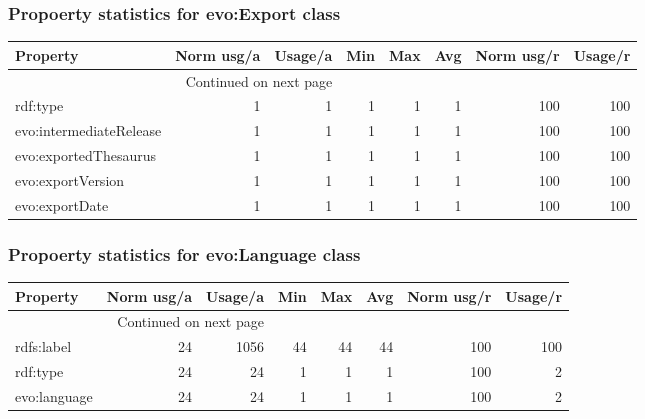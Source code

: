 \documentclass[10pt,a4paper,titlepage,final]{article}
\begin{document}
\subsubsection{Propoerty statistics for evo:Export class}
\begin{longtable}{lrrrrrrr}
\toprule
                Property &  Norm usg/a &  Usage/a &  Min &  Max &  Avg &  Norm usg/r &  Usage/r \\
\midrule
\endhead
\midrule
\multicolumn{3}{r}{{Continued on next page}} \\
\midrule
\endfoot

\bottomrule
\endlastfoot
                rdf:type &           1 &        1 &    1 &    1 &    1 &         100 &      100 \\
 evo:intermediateRelease &           1 &        1 &    1 &    1 &    1 &         100 &      100 \\
   evo:exportedThesaurus &           1 &        1 &    1 &    1 &    1 &         100 &      100 \\
       evo:exportVersion &           1 &        1 &    1 &    1 &    1 &         100 &      100 \\
          evo:exportDate &           1 &        1 &    1 &    1 &    1 &         100 &      100 \\
\end{longtable}


\subsubsection{Propoerty statistics for evo:Language class}
\begin{longtable}{lrrrrrrr}
\toprule
     Property &  Norm usg/a &  Usage/a &  Min &  Max &  Avg &  Norm usg/r &  Usage/r \\
\midrule
\endhead
\midrule
\multicolumn{3}{r}{{Continued on next page}} \\
\midrule
\endfoot

\bottomrule
\endlastfoot
   rdfs:label &          24 &     1056 &   44 &   44 &   44 &         100 &      100 \\
     rdf:type &          24 &       24 &    1 &    1 &    1 &         100 &        2 \\
 evo:language &          24 &       24 &    1 &    1 &    1 &         100 &        2 \\
\end{longtable}
\end{document}
